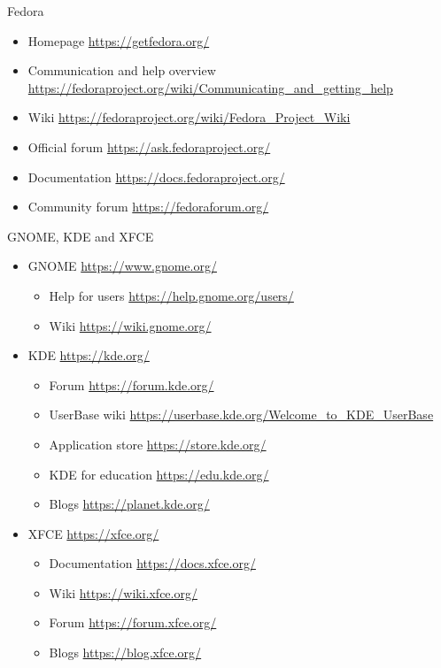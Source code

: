 \documentclass[compress, ucs, xelatex, 11pt, xcolor=svgnames, aspectratio=169,
	hyperref={
		bookmarks=true,
		unicode=true,
		colorlinks=true,
		pdftitle={Linux, command line and MetaCentrum},
		plainpages=false,
		pdfauthor={Vojtech Zeisek},
		pdfsubject={Course about use of Linux command line, writing shell scripts and using MetaCentrum of CESNET},
		pdfcreator={XeLaTeX},
		pdfkeywords={Linux, GNU, BASH, shell, command line, MetaCentrum},
		linkcolor=DarkRed, %
		anchorcolor=DarkBlue, %
		citecolor=Indigo, %
		filecolor=NavyBlue, %
		menucolor=DarkMagenta, %
		urlcolor=DarkBlue, %
		pdftex},
	url={hyphens, lowtilde} %
	]{beamer}
\begin{document}
\begin{frame}{Fedora}
	\begin{itemize}
		\item Homepage \url{https://getfedora.org/}
		\item Communication and help overview \url{https://fedoraproject.org/wiki/Communicating_and_getting_help}
		\item Wiki \url{https://fedoraproject.org/wiki/Fedora_Project_Wiki}
		\item Official forum \url{https://ask.fedoraproject.org/}
		\item Documentation \url{https://docs.fedoraproject.org/}
		\item Community forum \url{https://fedoraforum.org/}
	\end{itemize}
\end{frame}

\begin{frame}{GNOME, KDE and XFCE}
	\begin{itemize}
		\item GNOME \url{https://www.gnome.org/}
		\begin{itemize}
			\item Help for users \url{https://help.gnome.org/users/}
			\item Wiki \url{https://wiki.gnome.org/}
		\end{itemize}
		\item KDE \url{https://kde.org/}
		\begin{itemize}
			\item Forum \url{https://forum.kde.org/}
			\item UserBase wiki \url{https://userbase.kde.org/Welcome_to_KDE_UserBase}
			\item Application store \url{https://store.kde.org/}
			\item KDE for education \url{https://edu.kde.org/}
			\item Blogs \url{https://planet.kde.org/}
		\end{itemize}
		\item XFCE \url{https://xfce.org/}
		\begin{itemize}
			\item Documentation \url{https://docs.xfce.org/}
			\item Wiki \url{https://wiki.xfce.org/}
			\item Forum \url{https://forum.xfce.org/}
			\item Blogs \url{https://blog.xfce.org/}
		\end{itemize}
	\end{itemize}
\end{frame}
\end{document}
